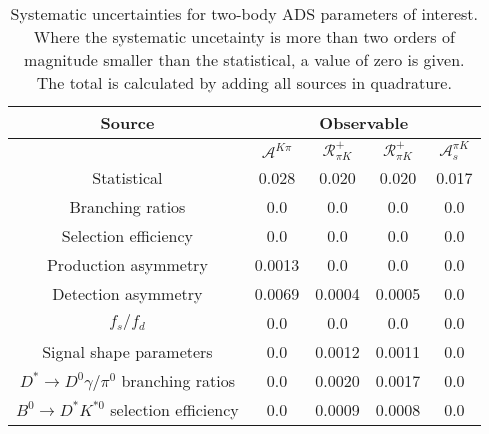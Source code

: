 \begin{sidewaystable}
  \centering
  \begin{tabular}{ccccc}
      \toprule
      Source & \multicolumn{4}{c}{Observable} \\
      \midrule
       & $\mathcal{A}^{K\pi}$ & $\mathcal{R}_{\pi K}^+$ & $\mathcal{R}_{\pi K}^+$ & $\mathcal{A}_s^{\pi K}$ \\
      \midrule
      Statistical & 0.028 & 0.020 & 0.020 & 0.017 \\
      \midrule
      Branching ratios & 0.0  & 0.0  & 0.0  & 0.0  \\
      Selection efficiency & 0.0  & 0.0  & 0.0  & 0.0  \\
      Production asymmetry & 0.0013 & 0.0  & 0.0  & 0.0  \\
      Detection asymmetry & 0.0069 & 0.0004 & 0.0005 & 0.0  \\
      $f_s/f_d$ & 0.0  & 0.0  & 0.0  & 0.0  \\
      Signal shape parameters & 0.0  & 0.0012 & 0.0011 & 0.0  \\
      $D^* \to D^0 \gamma/\pi^0$ branching ratios & 0.0  & 0.0020 & 0.0017 & 0.0  \\
      $B^0 \to D^* K^{*0}$ selection efficiency & 0.0  & 0.0009 & 0.0008 & 0.0  \\
      \bottomrule
  \end{tabular}
  \caption{Systematic uncertainties for two-body ADS parameters of interest. Where the systematic uncetainty is more than two orders of magnitude smaller than the statistical, a value of zero is given. The total is calculated by adding all sources in quadrature.}
\label{tab:twoBody_ADS_systematics}
\end{sidewaystable}
